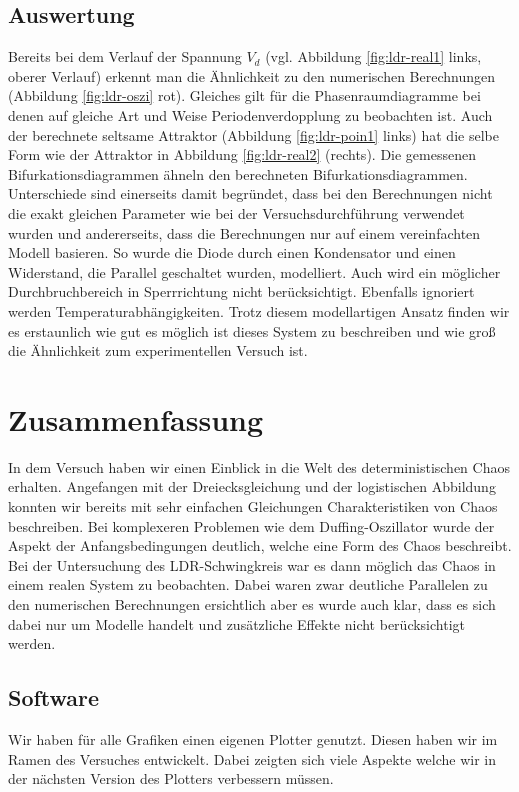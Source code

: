 \documentclass[11,5pt, twoside]{article}
\begin{document}
\subsection { Auswertung }
Bereits bei dem Verlauf der Spannung $V_d$ (vgl. Abbildung \ref{fig:ldr-real1} links, oberer Verlauf) erkennt man die Ähnlichkeit zu den numerischen Berechnungen (Abbildung \ref{fig:ldr-oszi} rot). Gleiches gilt für die Phasenraumdiagramme bei denen auf gleiche Art und Weise Periodenverdopplung zu beobachten ist. Auch der berechnete seltsame Attraktor (Abbildung \ref{fig:ldr-poin1} links) hat die selbe Form wie der Attraktor in Abbildung \ref{fig:ldr-real2} (rechts).
\newline
Die gemessenen Bifurkationsdiagrammen ähneln den berechneten Bifurkationsdiagrammen.
Unterschiede sind einerseits damit begründet, dass bei den Berechnungen nicht die exakt gleichen Parameter wie bei der Versuchsdurchführung verwendet wurden und andererseits, dass die Berechnungen nur auf einem vereinfachten Modell basieren. So wurde die Diode durch einen Kondensator und einen Widerstand, die Parallel geschaltet wurden, modelliert. Auch wird ein möglicher Durchbruchbereich in Sperrrichtung nicht berücksichtigt. Ebenfalls ignoriert werden Temperaturabhängigkeiten. Trotz diesem modellartigen Ansatz finden wir es erstaunlich wie gut es möglich ist dieses System zu beschreiben und wie groß die Ähnlichkeit zum experimentellen Versuch ist.
\pagebreak
\section { Zusammenfassung }
In dem Versuch haben wir einen Einblick in die Welt des deterministischen Chaos erhalten. Angefangen mit der Dreiecksgleichung und der logistischen Abbildung konnten wir bereits mit sehr einfachen Gleichungen Charakteristiken von Chaos beschreiben. Bei komplexeren Problemen wie dem Duffing-Oszillator wurde der Aspekt der Anfangsbedingungen deutlich, welche eine Form des Chaos beschreibt. Bei der Untersuchung des LDR-Schwingkreis war es dann möglich das Chaos in einem realen System zu beobachten. Dabei waren zwar deutliche Parallelen zu den numerischen Berechnungen ersichtlich aber es wurde auch klar, dass es sich dabei nur um Modelle handelt und zusätzliche Effekte nicht berücksichtigt werden.
\subsection{Software}
Wir haben für alle Grafiken einen eigenen Plotter genutzt. Diesen haben wir im Ramen des Versuches entwickelt. Dabei zeigten sich viele Aspekte welche wir in der nächsten Version des Plotters verbessern müssen.
\end{document}
